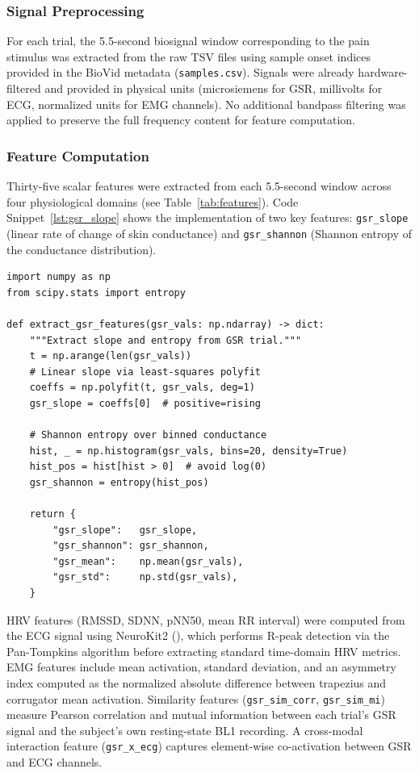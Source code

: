 \documentclass[10pt, twocolumn]{article}
\begin{document}
\subsubsection{Signal Preprocessing}

For each trial, the 5.5-second biosignal window corresponding to the pain stimulus was
extracted from the raw TSV files using sample onset indices provided in the BioVid metadata
(\texttt{samples.csv}). Signals were already hardware-filtered and provided in physical
units (microsiemens for GSR, millivolts for ECG, normalized units for EMG channels). No
additional bandpass filtering was applied to preserve the full frequency content for feature
computation.

\subsubsection{Feature Computation}

Thirty-five scalar features were extracted from each 5.5-second window across four
physiological domains (see Table~\ref{tab:features}).
Code Snippet~\ref{lst:gsr_slope} shows the implementation of two key features:
\texttt{gsr\_slope} (linear rate of change of skin conductance) and
\texttt{gsr\_shannon} (Shannon entropy of the conductance distribution).

\begin{lstlisting}[caption={GSR slope and Shannon entropy extraction from a single trial window. \texttt{gsr\_vals} is a 1-D NumPy array of skin conductance values (microsiemens) over 5.5 seconds.}, label={lst:gsr_slope}]
import numpy as np
from scipy.stats import entropy

def extract_gsr_features(gsr_vals: np.ndarray) -> dict:
    """Extract slope and entropy from GSR trial."""
    t = np.arange(len(gsr_vals))
    # Linear slope via least-squares polyfit
    coeffs = np.polyfit(t, gsr_vals, deg=1)
    gsr_slope = coeffs[0]  # positive=rising

    # Shannon entropy over binned conductance
    hist, _ = np.histogram(gsr_vals, bins=20, density=True)
    hist_pos = hist[hist > 0]  # avoid log(0)
    gsr_shannon = entropy(hist_pos)

    return {
        "gsr_slope":   gsr_slope,
        "gsr_shannon": gsr_shannon,
        "gsr_mean":    np.mean(gsr_vals),
        "gsr_std":     np.std(gsr_vals),
    }
\end{lstlisting}

HRV features (RMSSD, SDNN, pNN50, mean RR interval) were computed from the ECG signal
using NeuroKit2 (\cite{Makowski2021}), which performs R-peak detection via the
Pan-Tompkins algorithm before extracting standard time-domain HRV metrics. EMG features
include mean activation, standard deviation, and an asymmetry index computed as the
normalized absolute difference between trapezius and corrugator mean activation. Similarity features
(\texttt{gsr\_sim\_corr}, \texttt{gsr\_sim\_mi}) measure Pearson correlation and mutual
information between each trial's GSR signal and the subject's own resting-state BL1
recording. A cross-modal interaction feature (\texttt{gsr\_x\_ecg}) captures
element-wise co-activation between GSR and ECG channels.
\end{document}
